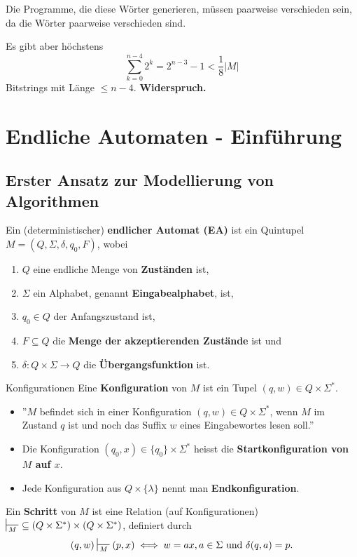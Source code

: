 \documentclass[a4paper, 11pt]{article}
\begin{document}
        Die Programme, die diese Wörter generieren, müssen paarweise verschieden sein, da die Wörter paarweise verschieden sind.
    
        Es gibt aber höchstens 
        $$\sum_{k=0}^{n-4}2^k = 2^{n-3} - 1 < \frac{1}{8}|M|$$
        Bitstrings mit Länge $\leq n-4$. \textbf{Widerspruch.}
    


        \vspace*{1cm}
    


    \section{Endliche Automaten - Einführung}

	\subsection{Erster Ansatz zur Modellierung von Algorithmen}
	\begin{mainbox}{}
		Ein (deterministischer) \textbf{endlicher Automat (EA)} ist ein Quintupel $M = (Q, \Sigma, \delta, q_0, F)$, wobei
		\begin{enumerate}[label=(\roman*)]
			\item $Q$ eine endliche Menge von \textbf{Zuständen} ist,
			\item $\Sigma$ ein Alphabet, genannt \textbf{Eingabealphabet}, ist,
			\item $q_0 \in Q$ der Anfangszustand ist,
			\item $F \subseteq Q$ die \textbf{Menge der akzeptierenden Zustände} ist und
			\item $\delta: Q \times \Sigma \to Q$ die \textbf{Übergangsfunktion} ist.
		\end{enumerate}
	\end{mainbox}



	
	\begin{mainbox}{Konfigurationen}
		Eine \textbf{Konfiguration} von $M$ ist ein Tupel $(q, w) \in Q \times \Sigma^*$. 
	\end{mainbox}
	\begin{itemize}[label=-]
		\item ''$M$ befindet sich in einer Konfiguration $(q,w) \in Q \times \Sigma^*$, wenn $M$ im Zustand $q$ ist und noch das Suffix $w$ eines Eingabewortes lesen soll.''
		\item Die Konfiguration $(q_0, x) \in \{q_0\} \times \Sigma^*$ heisst die \textbf{Startkonfiguration von $M$ auf $x$}.
		\item Jede Konfiguration aus $Q \times \{\lambda\}$ nennt man \textbf{Endkonfiguration}.
	\end{itemize}
	\begin{mainbox}{}
		Ein \textbf{Schritt} von $M$ ist eine Relation (auf Konfigurationen) $\sststile{M}{} \ \subseteq (Q \times \Sigma^*)\times(Q\times \Sigma^*)$, definiert durch
		$$(q, w) \sststile{M}{}(p, x) \iff w = ax, a \in \Sigma \text{ und }\delta(q, a) = p.$$
	\end{mainbox}
\end{document}

